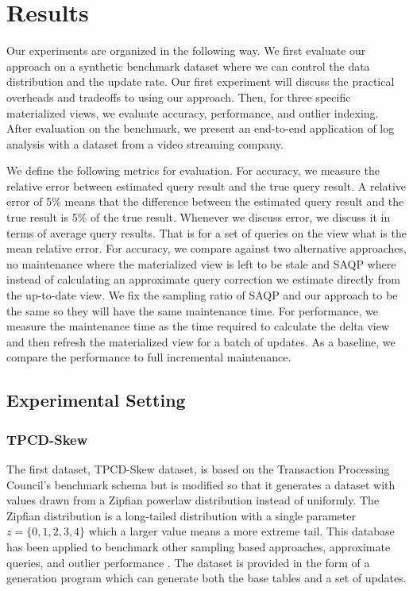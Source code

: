 \section{Results}
\label{exp}
Our experiments are organized in the following way.
We first evaluate our approach on a synthetic benchmark dataset where we can control the data distribution and the update rate.
Our first experiment will discuss the practical overheads and tradeoffs to using our approach.
Then, for three specific materialized views, we evaluate accuracy, performance, and outlier indexing.
After evaluation on the benchmark, we present an end-to-end application of log analysis with a dataset from a video streaming company.

We define the following metrics for evaluation.
For accuracy, we measure the relative error between estimated query result and the true query result.
A relative error of 5\% means that the difference between the estimated query result and the true result is 5\% of the true result.
Whenever we discuss error, we discuss it in terms of average query results. 
That is for a set of queries on the view what is the mean relative error. 
For accuracy, we compare against two alternative approaches, no maintenance where the materialized view is left to be stale and SAQP where instead 
of calculating an approximate query correction we estimate directly from the up-to-date view.
We fix the sampling ratio of SAQP and our approach to be the same so they will have the same maintenance time.
For performance, we measure the maintenance time as the time required to calculate the delta view and then refresh the materialized view for a batch of updates.
As a baseline, we compare the performance to full incremental maintenance.

\subsection{Experimental Setting}
\subsubsection{TPCD-Skew}
The first dataset, TPCD-Skew dataset, is based on the Transaction Processing Council's benchmark
schema but is modified so that it generates a dataset with values drawn from a Zipfian powerlaw distribution instead of uniformly.
The Zipfian distribution \cite{mitzenmacher2004brief} is a long-tailed distribution with a single parameter $z=\{0,1,2,3,4\}$ which a larger
value means a more extreme tail.
This database has been applied to benchmark other sampling based approaches, approximate queries, and outlier performance \cite{chaudhuri2001overcoming, agrawal2005database}.
The dataset is provided in the form of a generation program which can generate both the base tables and a set of updates.

